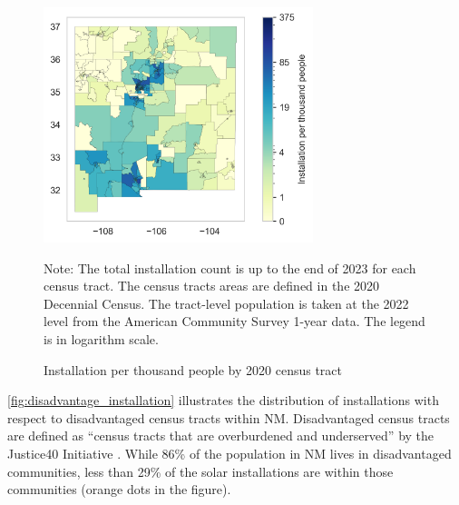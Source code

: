 \documentclass[11pt,twoside,letterpaper]{article}
\begin{document}
\begin{figure}[H]
    \centering
\includegraphics[width=0.7\textwidth]{figures/tract_count_per_kpop_map.png}
    \caption{Installation per thousand people by 2020 census tract}
    \label{fig:install_kpop}
      \begin{flushleft}
        \footnotesize Note: The total installation count is up to the end of 2023 for each census tract. The census tracts areas are defined in the 2020 Decennial Census. The tract-level population is taken at the 2022 level from the American Community Survey 1-year data. The legend is in logarithm scale. 
    \end{flushleft}
\end{figure}


\autoref{fig:disadvantage_installation} illustrates the distribution of installations with respect to disadvantaged census tracts within NM. Disadvantaged census tracts are defined as “census tracts that are overburdened and underserved” by the Justice40 Initiative \parencite{justice40}. While 86\% of the population in NM lives in disadvantaged communities, less than 29\% of the solar installations are within those communities (orange dots in the figure).
\end{document}
